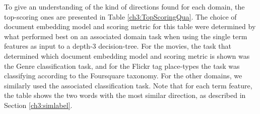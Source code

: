 To give an understanding of the kind of directions found for each domain, the top-scoring ones are presented in Table \ref{ch3:TopScoringQua}. The choice of document embedding model and scoring metric  for this table were determined by what performed best on an associated domain task when using the single term features as input to a depth-3 decision-tree. For the movies, the task that determined which document embedding model and scoring metric is shown was the Genre classification task, and for the Flickr tag place-types the task  was  classifying according to the Foursquare taxonomy. For the other domains, we similarly used the associated classification task. Note that for each term feature, the table shows the two words with the most similar direction, as described in Section \ref{ch3:simlabel}. 




